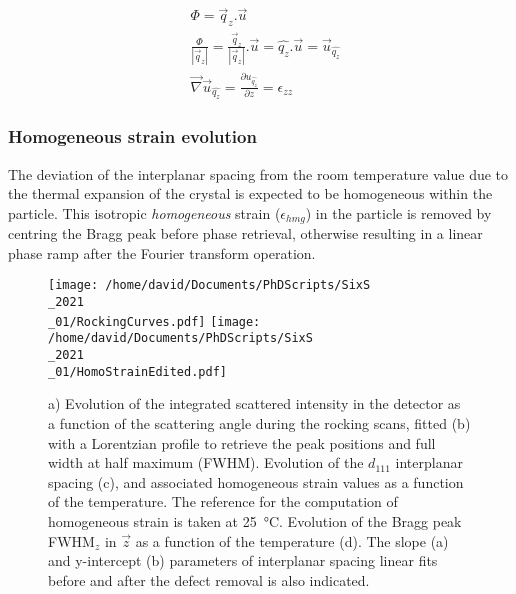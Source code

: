 \begin{align}
    \label{eq:StrainFromPhase1}
    & \Phi =  \vec{q}_z.\vec{u} \\
    \label{eq:StrainFromPhase2}
    & \frac{\Phi}{|\vec{q}_z|} = \frac{\vec{q}_z}{|\vec{q}_z|}.\vec{u} = \hat{q_z}.\vec{u} = \vec{u}_{\hat{q_z}} \\
    \label{eq:StrainFromPhase3}
    & \vec{\nabla} \vec{u}_{\hat{q_z}} = \frac{\partial u_{\hat{q_z}}}{\partial z} = \epsilon_{zz}
\end{align}

\subsubsection{Homogeneous strain evolution}

The deviation of the interplanar spacing from the room temperature value due to the thermal expansion of the crystal is expected to be homogeneous within the particle.
This isotropic \textit{homogeneous} strain ($\epsilon_{hmg}$) in the particle is removed by centring the Bragg peak before phase retrieval, otherwise resulting in a linear phase ramp after the Fourier transform operation.


\begin{figure}[!htb]
    \centering
    \texttt{[image: /home/david/Documents/PhDScripts/SixS\\\_2021\\\_01/RockingCurves.pdf]}
    \texttt{[image: /home/david/Documents/PhDScripts/SixS\\\_2021\\\_01/HomoStrainEdited.pdf]}
    \caption{
        a) Evolution of the integrated scattered intensity in the detector as a function of the scattering angle during the rocking scans, fitted (b) with a Lorentzian profile to retrieve the peak positions and full width at half maximum (FWHM).
        Evolution of the $d_{111}$ interplanar spacing (c), and associated homogeneous strain values as a function of the temperature.
        The reference for the computation of homogeneous strain is taken at \qty{25}{\degreeCelsius}.
        Evolution of the Bragg peak FWHM$_z$ in $\vec{z}$ as a function of the temperature (d).
        The slope (a) and y-intercept (b) parameters of interplanar spacing linear fits before and after the defect removal is also indicated.
    }
    \label{fig:AmaterasuHomoStrain}
\end{figure}

